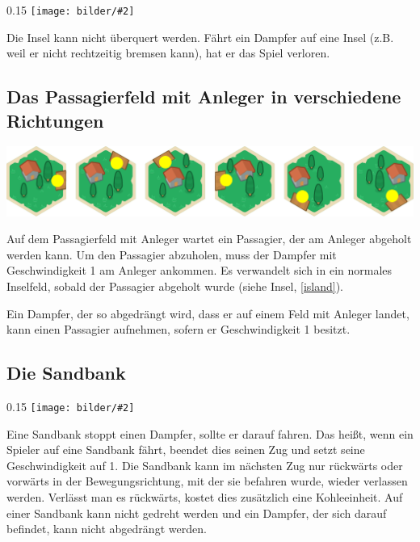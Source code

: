 \documentclass[12pt,a4paper, ngerman, oneside]{scrartcl}
\newcommand{\fieldGraphic}[2]{%
\begin{floatingfigure}[#1]{0.15\textwidth}%
  \centering
  \texttt{[image: bilder/\#2]}%
\end{floatingfigure}%
}
\begin{document}
\fieldGraphic{r}{insel}

Die Insel kann nicht überquert werden. Fährt ein Dampfer auf eine Insel (z.B.
weil er nicht rechtzeitig bremsen kann), hat er das Spiel verloren.

\paragraph{}

\subsection{\label{passenger}Das Passagierfeld mit Anleger in verschiedene Richtungen}

\includegraphics[width=\textwidth]{bilder/passagier}

Auf dem Passagierfeld mit Anleger wartet ein Passagier, der am Anleger abgeholt
werden kann. Um den Passagier abzuholen, muss der Dampfer mit Geschwindigkeit 1
am Anleger ankommen. Es verwandelt sich in ein normales Inselfeld, sobald der
Passagier abgeholt wurde (siehe Insel, \ref{island}).

Ein Dampfer, der so abgedrängt wird, dass er auf einem Feld mit Anleger landet,
kann einen Passagier aufnehmen, sofern er Geschwindigkeit 1 besitzt.


\subsection{\label{sandbank}Die Sandbank}

\fieldGraphic{r}{sandbank}

Eine Sandbank stoppt einen Dampfer, sollte er darauf fahren. Das heißt, wenn ein
Spieler auf eine Sandbank fährt, beendet dies seinen Zug und setzt seine
Geschwindigkeit auf 1. Die Sandbank kann im nächsten Zug nur rückwärts oder
vorwärts in der Bewegungsrichtung, mit der sie befahren wurde, wieder verlassen
werden. Verlässt man es rückwärts, kostet dies zusätzlich eine Kohleeinheit. Auf
einer Sandbank kann nicht gedreht werden und ein Dampfer, der sich darauf
befindet, kann nicht abgedrängt werden.

\paragraph{}
\end{document}
